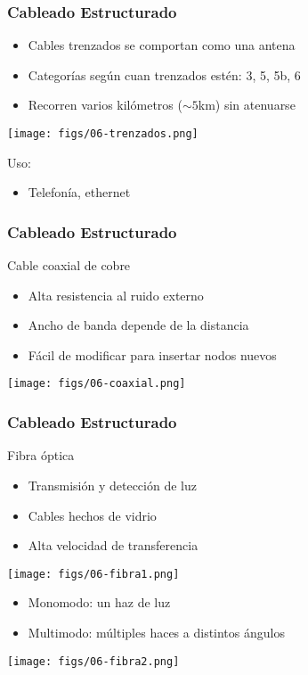 \documentclass[letter]{beamer}
\begin{document}
\begin{frame}
  \frametitle{Cableado Estructurado}

  \begin{itemize}
    \item Cables trenzados se comportan como una antena
    \item Categorías según cuan trenzados estén: 3, 5, 5b, 6
    \item Recorren varios kilómetros ($\sim 5$km) sin atenuarse
  \end{itemize}
  \begin{center}
    \texttt{[image: figs/06-trenzados.png]}
  \end{center}
  Uso:
  \begin{itemize}
    \item Telefonía, ethernet
  \end{itemize}
\end{frame}
\begin{frame}
  \frametitle{Cableado Estructurado}
  
  Cable coaxial de cobre
  \begin{itemize}
    \item Alta resistencia al ruido externo
    \item Ancho de banda depende de la distancia
    \item Fácil de modificar para insertar nodos nuevos
  \end{itemize}
  \begin{center}
    \texttt{[image: figs/06-coaxial.png]}
  \end{center}

\end{frame}
\begin{frame}
  \frametitle{Cableado Estructurado}

  Fibra óptica
  \begin{itemize}
    \item Transmisión y detección de luz
    \item Cables hechos de vidrio
    \item Alta velocidad de transferencia
  \end{itemize}
  \begin{center}
    \texttt{[image: figs/06-fibra1.png]}
  \end{center}
  \begin{itemize}
    \item Monomodo: un haz de luz
    \item Multimodo: múltiples haces a distintos ángulos
  \end{itemize}
  \begin{center}
    \texttt{[image: figs/06-fibra2.png]}
  \end{center}
\end{frame}
\end{document}
